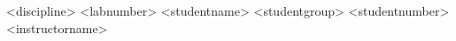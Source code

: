 



\thetitlepage
  {<discipline>}
  {<labnumber>}
  {<studentname>}
  {<studentgroup>}
  {<studentnumber>}
  {<instructorname>}


